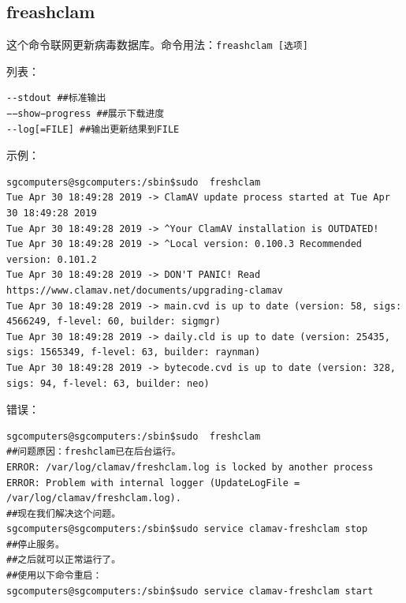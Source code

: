 \subsection{freashclam}
\cite{mancf}\par
这个命令联网更新病毒数据库。命令用法：\verb|freashclam [选项] |\par
[选项]列表：\par
\begin{verbatim}
--stdout ##标准输出
−−show−progress ##展示下载进度
--log[=FILE] ##输出更新结果到FILE
\end{verbatim} \par
示例：
\begin{verbatim}
sgcomputers@sgcomputers:/sbin$sudo  freshclam
Tue Apr 30 18:49:28 2019 -> ClamAV update process started at Tue Apr 30 18:49:28 2019
Tue Apr 30 18:49:28 2019 -> ^Your ClamAV installation is OUTDATED!
Tue Apr 30 18:49:28 2019 -> ^Local version: 0.100.3 Recommended version: 0.101.2
Tue Apr 30 18:49:28 2019 -> DON'T PANIC! Read https://www.clamav.net/documents/upgrading-clamav
Tue Apr 30 18:49:28 2019 -> main.cvd is up to date (version: 58, sigs: 4566249, f-level: 60, builder: sigmgr)
Tue Apr 30 18:49:28 2019 -> daily.cld is up to date (version: 25435, sigs: 1565349, f-level: 63, builder: raynman)
Tue Apr 30 18:49:28 2019 -> bytecode.cvd is up to date (version: 328, sigs: 94, f-level: 63, builder: neo)
\end{verbatim} \par
错误：
\begin{verbatim}
sgcomputers@sgcomputers:/sbin$sudo  freshclam
##问题原因：freshclam已在后台运行。
ERROR: /var/log/clamav/freshclam.log is locked by another process
ERROR: Problem with internal logger (UpdateLogFile = /var/log/clamav/freshclam.log).
##现在我们解决这个问题。
sgcomputers@sgcomputers:/sbin$sudo service clamav-freshclam stop
##停止服务。
##之后就可以正常运行了。
##使用以下命令重启：
sgcomputers@sgcomputers:/sbin$sudo service clamav-freshclam start
\end{verbatim}
